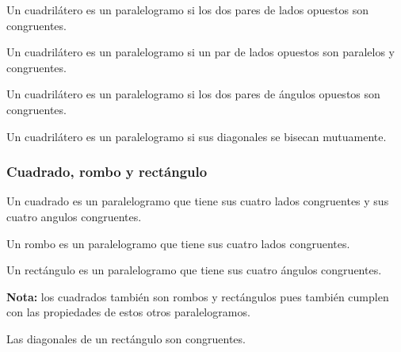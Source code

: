 \begin{theorem}
    Un cuadrilátero es un paralelogramo si los dos pares de lados opuestos son congruentes.
\end{theorem}

\begin{theorem}
    Un cuadrilátero es un paralelogramo si un par de lados opuestos son paralelos y congruentes.
\end{theorem}

\begin{theorem}
    Un cuadrilátero es un paralelogramo si los dos pares de ángulos opuestos son congruentes.
\end{theorem}

\begin{theorem}
    Un cuadrilátero es un paralelogramo si sus diagonales se bisecan mutuamente.
\end{theorem}

\subsubsection{Cuadrado, rombo y rectángulo}

\begin{definition}
    Un cuadrado es un paralelogramo que tiene sus cuatro lados congruentes y sus cuatro angulos congruentes.
\end{definition}

\begin{definition}
    Un rombo es un paralelogramo que tiene sus cuatro lados congruentes.
\end{definition}

\begin{definition}
    Un rectángulo es un paralelogramo que tiene sus cuatro ángulos congruentes.
\end{definition}

\textbf{Nota:} los cuadrados también son rombos y rectángulos pues también cumplen con las propiedades de estos otros paralelogramos.

\begin{theorem}
    Las diagonales de un rectángulo son congruentes.

    \begin{figure}[!h]
        \centering
        
        \label{fig:theorem14}
    \end{figure}
    
\end{theorem}

